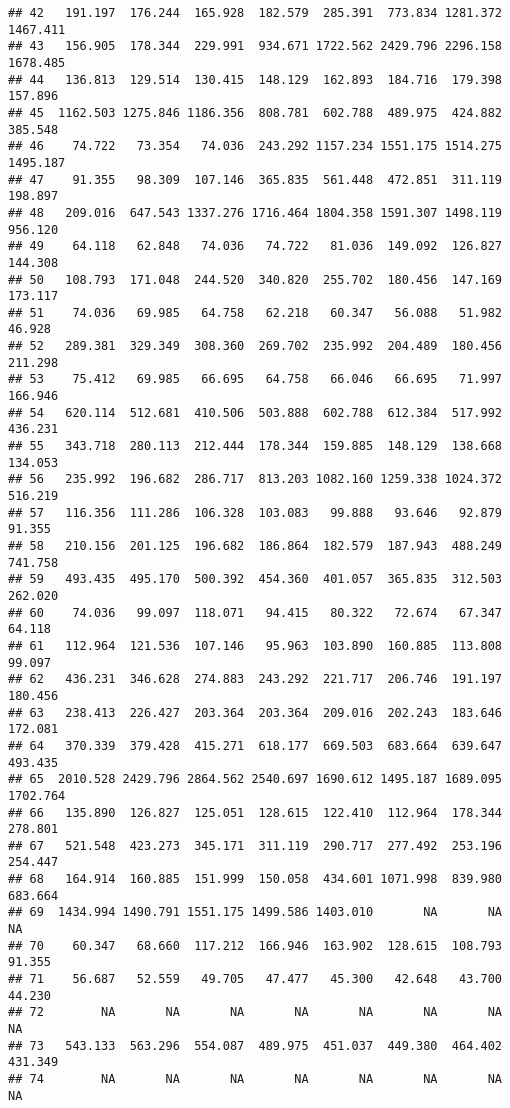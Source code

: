 \documentclass[
]{article}
\begin{document}
\begin{verbatim}
## 42   191.197  176.244  165.928  182.579  285.391  773.834 1281.372 1467.411
## 43   156.905  178.344  229.991  934.671 1722.562 2429.796 2296.158 1678.485
## 44   136.813  129.514  130.415  148.129  162.893  184.716  179.398  157.896
## 45  1162.503 1275.846 1186.356  808.781  602.788  489.975  424.882  385.548
## 46    74.722   73.354   74.036  243.292 1157.234 1551.175 1514.275 1495.187
## 47    91.355   98.309  107.146  365.835  561.448  472.851  311.119  198.897
## 48   209.016  647.543 1337.276 1716.464 1804.358 1591.307 1498.119  956.120
## 49    64.118   62.848   74.036   74.722   81.036  149.092  126.827  144.308
## 50   108.793  171.048  244.520  340.820  255.702  180.456  147.169  173.117
## 51    74.036   69.985   64.758   62.218   60.347   56.088   51.982   46.928
## 52   289.381  329.349  308.360  269.702  235.992  204.489  180.456  211.298
## 53    75.412   69.985   66.695   64.758   66.046   66.695   71.997  166.946
## 54   620.114  512.681  410.506  503.888  602.788  612.384  517.992  436.231
## 55   343.718  280.113  212.444  178.344  159.885  148.129  138.668  134.053
## 56   235.992  196.682  286.717  813.203 1082.160 1259.338 1024.372  516.219
## 57   116.356  111.286  106.328  103.083   99.888   93.646   92.879   91.355
## 58   210.156  201.125  196.682  186.864  182.579  187.943  488.249  741.758
## 59   493.435  495.170  500.392  454.360  401.057  365.835  312.503  262.020
## 60    74.036   99.097  118.071   94.415   80.322   72.674   67.347   64.118
## 61   112.964  121.536  107.146   95.963  103.890  160.885  113.808   99.097
## 62   436.231  346.628  274.883  243.292  221.717  206.746  191.197  180.456
## 63   238.413  226.427  203.364  203.364  209.016  202.243  183.646  172.081
## 64   370.339  379.428  415.271  618.177  669.503  683.664  639.647  493.435
## 65  2010.528 2429.796 2864.562 2540.697 1690.612 1495.187 1689.095 1702.764
## 66   135.890  126.827  125.051  128.615  122.410  112.964  178.344  278.801
## 67   521.548  423.273  345.171  311.119  290.717  277.492  253.196  254.447
## 68   164.914  160.885  151.999  150.058  434.601 1071.998  839.980  683.664
## 69  1434.994 1490.791 1551.175 1499.586 1403.010       NA       NA       NA
## 70    60.347   68.660  117.212  166.946  163.902  128.615  108.793   91.355
## 71    56.687   52.559   49.705   47.477   45.300   42.648   43.700   44.230
## 72        NA       NA       NA       NA       NA       NA       NA       NA
## 73   543.133  563.296  554.087  489.975  451.037  449.380  464.402  431.349
## 74        NA       NA       NA       NA       NA       NA       NA       NA

\end{verbatim}
\end{document}
